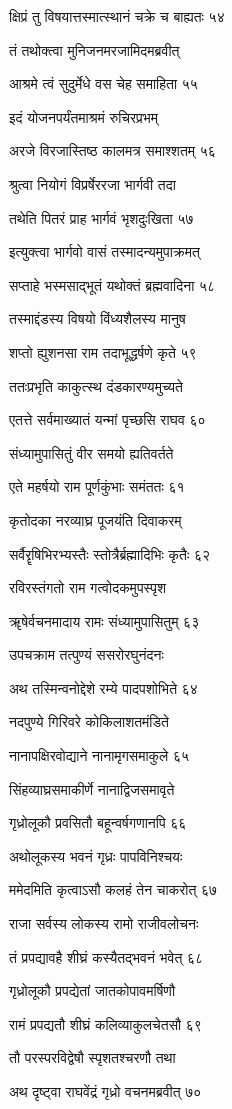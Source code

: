 क्षिप्रं तु विषयात्तस्मात्स्थानं चक्रे च बाह्यतः ५४

तं तथोक्त्वा मुनिजनमरजामिदमब्रवीत्

आश्रमे त्वं सुदुर्मेधे वस चेह समाहिता ५५

इदं योजनपर्यंतमाश्रमं रुचिरप्रभम्

अरजे विरजास्तिष्ठ कालमत्र समाश्शतम् ५६

श्रुत्वा नियोगं विप्रर्षेररजा भार्गवी तदा

तथेति पितरं प्राह भार्गवं भृशदुःखिता ५७

इत्युक्त्वा भार्गवो वासं तस्मादन्यमुपाक्रमत्

सप्ताहे भस्मसाद्भूतं यथोक्तं ब्रह्मवादिना ५८

तस्माद्दंडस्य विषयो विंध्यशैलस्य मानुष

शप्तो ह्युशनसा राम तदाभूद्धर्षणे कृते ५९

ततःप्रभृति काकुत्स्थ दंडकारण्यमुच्यते

एतत्ते सर्वमाख्यातं यन्मां पृच्छसि राघव ६०

संध्यामुपासितुं वीर समयो ह्यतिवर्तते

एते महर्षयो राम पूर्णकुंभाः समंततः ६१

कृतोदका नरव्याघ्र पूजयंति दिवाकरम्

सर्वैरॄषिभिरभ्यस्तैः स्तोत्रैर्ब्रह्मादिभिः कृतैः ६२

रविरस्तंगतो राम गत्वोदकमुपस्पृश

ॠषेर्वचनमादाय रामः संध्यामुपासितुम् ६३

उपचक्राम तत्पुण्यं ससरोरघुनंदनः

अथ तस्मिन्वनोद्देशे रम्ये पादपशोभिते ६४

नदपुण्ये गिरिवरे कोकिलाशतमंडिते

नानापक्षिरवोद्याने नानामृगसमाकुले ६५

सिंहव्याघ्रसमाकीर्णे नानाद्विजसमावृते

गृध्रोलूकौ प्रवसितौ बहून्वर्षगणानपि ६६

अथोलूकस्य भवनं गृध्रः पापविनिश्चयः

ममेदमिति कृत्वाऽसौ कलहं तेन चाकरोत् ६७

राजा सर्वस्य लोकस्य रामो राजीवलोचनः

तं प्रपद्यावहै शीघ्रं कस्यैतद्भवनं भवेत् ६८

गृध्रोलूकौ प्रपद्येतां जातकोपावमर्षिणौ

रामं प्रपद्यतौ शीघ्रं कलिव्याकुलचेतसौ ६९

तौ परस्परविद्वेषौ स्पृशतश्चरणौ तथा

अथ दृष्ट्वा राघवेंद्रं गृध्रो वचनमब्रवीत् ७०

